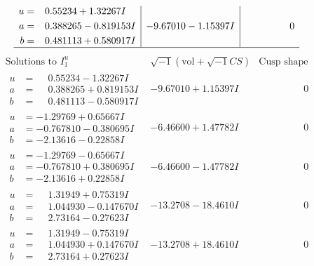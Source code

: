 \documentclass[1p]{elsarticle_modified}
\theoremstyle{definition}
\newcommand{\I}{\sqrt{-1}}
\begin{document}
$$\begin{array}{c|c|c}
\begin{aligned}
u &= \phantom{-}0.55234 + 1.32267 I \\
a &= \phantom{-}0.388265 - 0.819153 I \\
b &= \phantom{-}0.481113 + 0.580917 I\end{aligned}
 & -9.67010 - 1.15397 I & \phantom{-0.000000 } 0\\
 \hline 
 \end{array}$$\newpage$$\begin{array}{c|c|c}  
\text{Solutions to }I^u_{1}& \I (\text{vol} + \sqrt{-1}CS) & \text{Cusp shape}\\
 \hline 
\begin{aligned}
u &= \phantom{-}0.55234 - 1.32267 I \\
a &= \phantom{-}0.388265 + 0.819153 I \\
b &= \phantom{-}0.481113 - 0.580917 I\end{aligned}
 & -9.67010 + 1.15397 I & \phantom{-0.000000 } 0 \\ \hline\begin{aligned}
u &= -1.29769 + 0.65667 I \\
a &= -0.767810 - 0.380695 I \\
b &= -2.13616 - 0.22858 I\end{aligned}
 & -6.46600 + 1.47782 I & \phantom{-0.000000 } 0 \\ \hline\begin{aligned}
u &= -1.29769 - 0.65667 I \\
a &= -0.767810 + 0.380695 I \\
b &= -2.13616 + 0.22858 I\end{aligned}
 & -6.46600 - 1.47782 I & \phantom{-0.000000 } 0 \\ \hline\begin{aligned}
u &= \phantom{-}1.31949 + 0.75319 I \\
a &= \phantom{-}1.044930 - 0.147670 I \\
b &= \phantom{-}2.73164 - 0.27623 I\end{aligned}
 & -13.2708 - 18.4610 I & \phantom{-0.000000 } 0 \\ \hline\begin{aligned}
u &= \phantom{-}1.31949 - 0.75319 I \\
a &= \phantom{-}1.044930 + 0.147670 I \\
b &= \phantom{-}2.73164 + 0.27623 I\end{aligned}
 & -13.2708 + 18.4610 I & \phantom{-0.000000 } 0 \\ \hline\begin{aligned}

\end{aligned}
\end{array}$$
\end{document}
